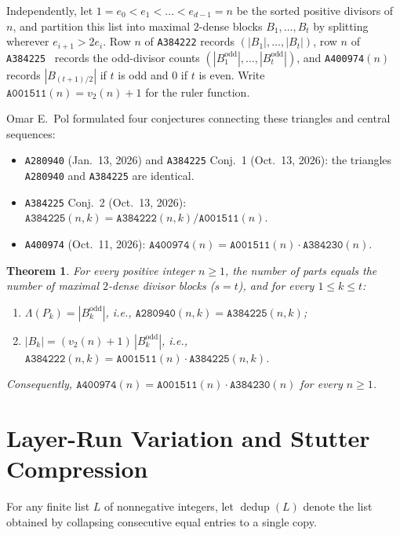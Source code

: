 \documentclass[11pt]{article}
\newtheorem{theorem}{Theorem}[section]
\begin{document}
Independently, let $1 = e_0 < e_1 < \dots < e_{d-1} = n$ be the sorted positive divisors of $n$, and partition this list into maximal $2$-dense blocks $B_1, \dots, B_t$ by splitting wherever $e_{i+1} > 2 e_i$. Row $n$ of \texttt{A384222} records $(|B_1|, \dots, |B_t|)$, row $n$ of \texttt{A384225}~\cite{OEIS-A384225} records the odd-divisor counts $(|B_1^{\mathrm{odd}}|, \dots, |B_t^{\mathrm{odd}}|)$, and \texttt{A400974}$(n)$~\cite{OEIS-A400974} records $|B_{(t+1)/2}|$ if $t$ is odd and $0$ if $t$ is even. Write $\texttt{A001511}(n) = v_2(n) + 1$ for the ruler function.

Omar E.~Pol formulated four conjectures connecting these triangles and central sequences:
\begin{itemize}
  \item \texttt{A280940} (Jan.~13, 2026) and \texttt{A384225} Conj.~1 (Oct.~13, 2026): the triangles \texttt{A280940} and \texttt{A384225} are identical.
  \item \texttt{A384225} Conj.~2 (Oct.~13, 2026): $\texttt{A384225}(n,k) = \texttt{A384222}(n,k) / \texttt{A001511}(n)$.
  \item \texttt{A400974} (Oct.~11, 2026): $\texttt{A400974}(n) = \texttt{A001511}(n) \cdot \texttt{A384230}(n)$.
\end{itemize}

\begin{theorem}\label{thm:main}
For every positive integer $n \ge 1$, the number of parts equals the number of maximal $2$-dense divisor blocks ($s = t$), and for every $1 \le k \le t$:
\begin{enumerate}
  \item $\Lambda(P_k) = |B_k^{\mathrm{odd}}|$, i.e., $\texttt{A280940}(n, k) = \texttt{A384225}(n, k)$;
  \item $|B_k| = (v_2(n) + 1)\,|B_k^{\mathrm{odd}}|$, i.e., $\texttt{A384222}(n, k) = \texttt{A001511}(n)\cdot \texttt{A384225}(n, k)$.
\end{enumerate}
Consequently, $\texttt{A400974}(n) = \texttt{A001511}(n) \cdot \texttt{A384230}(n)$ for every $n \ge 1$.
\end{theorem}

\section{Layer-Run Variation and Stutter Compression}

For any finite list $L$ of nonnegative integers, let $\operatorname{dedup}(L)$ denote the list obtained by collapsing consecutive equal entries to a single copy.
\end{document}
